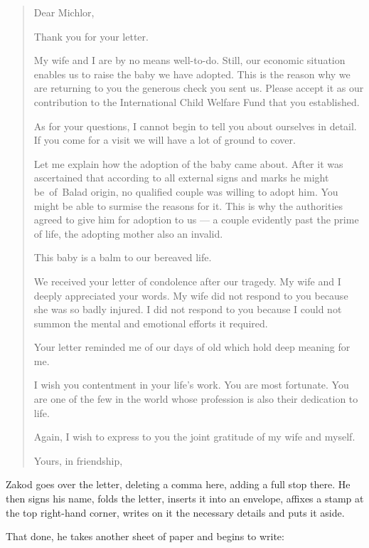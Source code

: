 \documentclass[twoside,11pt,openany]{book}
\begin{document}
\begin{quotation}
Dear Michlor,

Thank you for your letter.

My wife and I are by no means well-to-do. Still, our economic situation enables us to raise the baby we have adopted.
This is the reason why we are returning to you the generous check you sent us. Please accept it as our contribution to
the International Child Welfare Fund that you established.

As for your questions, I cannot begin to tell you about ourselves in detail. If you come for a visit we will have a lot
of ground to cover.

Let me explain how the adoption of the baby came about.  After it was ascertained that according to all external signs
and marks he might be~of~Balad origin, no qualified couple was willing to adopt him. You might be able to surmise the
reasons for it. This is why the authorities agreed to give him for adoption to us --- a couple evidently past the prime
of life, the adopting mother also an invalid.

This baby is a balm to our bereaved life.

We received your letter of condolence after our tragedy. My wife and I deeply appreciated your words. My wife did not
respond to you because she was so badly injured. I did not respond to you because I could not summon the mental and
emotional efforts it required.

Your letter reminded me of our days of old which hold deep meaning for me.

I wish you contentment in your life's work. You are most fortunate. You are one of the few in the world whose profession
is also their dedication to life.

Again, I wish to express to you the joint gratitude of my wife and myself.

Yours, in friendship,
\end{quotation}

Zakod goes over the letter, deleting a comma here, adding a full stop there. He then signs his name, folds the letter,
inserts it into an envelope, affixes a stamp at the top right-hand corner, writes on it the necessary details and puts it
aside.

That done, he takes another sheet of paper and begins to write:
\pagebreak[4]
\end{document}

